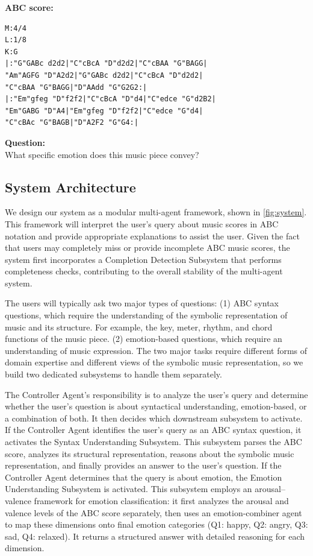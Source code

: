 \documentclass[sigconf]{acmart}
\begin{document}
\begin{tcolorbox}[
    title=Example of a user prompt, 
    colback=gray!10, 
    colframe=gray!60,
    before skip=2pt,   %
    after skip=2pt     %
    ]
\textbf{ABC score:}
\begin{verbatim}
M:4/4
L:1/8
K:G
|:"G"GABc d2d2|"C"cBcA "D"d2d2|"C"cBAA "G"BAGG|
"Am"AGFG "D"A2d2|"G"GABc d2d2|"C"cBcA "D"d2d2|
"C"cBAA "G"BAGG|"D"AAdd "G"G2G2:|
|:"Em"gfeg "D"f2f2|"C"cBcA "D"d4|"C"edce "G"d2B2|
"Em"GABG "D"A4|"Em"gfeg "D"f2f2|"C"edce "G"d4|
"C"cBAc "G"BAGB|"D"A2F2 "G"G4:|
\end{verbatim}
\textbf{Question:} \\
What specific emotion does this music piece convey?
\end{tcolorbox}

\subsection{System Architecture}
We design our system as a modular multi-agent framework, shown in \autoref{fig:system}. This framework will interpret the user’s query about music scores in ABC notation and provide appropriate explanations to assist the user. Given the fact that users may completely miss or provide incomplete ABC music scores, the system first incorporates a Completion Detection Subsystem that performs completeness checks, contributing to the overall stability of the multi-agent system. 

The users will typically ask two major types of questions: (1) ABC syntax questions, which require the understanding of the symbolic representation of music and its structure. For example, the key, meter, rhythm, and chord functions of the music piece. (2) emotion-based questions, which require an understanding of music expression. The two major tasks require different forms of domain expertise and different views of the symbolic music representation, so we build two dedicated subsystems to handle them separately. 

The Controller Agent’s responsibility is to analyze the user’s query and determine whether the user’s question is about syntactical understanding, emotion-based, or a combination of both. It then decides which downstream subsystem to activate. If the Controller Agent identifies the user’s query as an ABC syntax question, it activates the Syntax Understanding Subsystem. This subsystem parses the ABC score, analyzes its structural representation, reasons about the symbolic music representation, and finally provides an answer to the user’s question. If the Controller Agent determines that the query is about emotion, the Emotion Understanding Subsystem is activated. This subsystem employs an arousal–valence framework for emotion classification: it first analyzes the arousal and valence levels of the ABC score separately, then uses an emotion-combiner agent to map these dimensions onto final emotion categories (Q1: happy, Q2: angry, Q3: sad, Q4: relaxed). It returns a structured answer with detailed reasoning for each dimension. 
\end{document}
